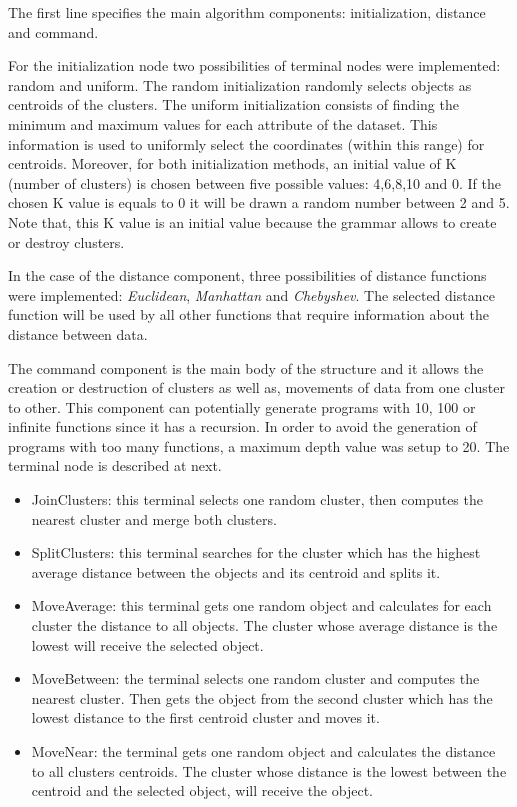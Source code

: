 \documentclass[conference,compsoc]{IEEEtran}
\begin{document}
The first line specifies the main algorithm components: initialization, distance and command. 


For the initialization node two possibilities of terminal nodes were implemented: random and uniform. The random initialization randomly selects  objects as centroids of the clusters. The uniform initialization consists of finding the minimum and maximum values for each attribute of the dataset. This information is used to uniformly select the coordinates (within this range) for centroids. Moreover, for both initialization methods, an initial value of K (number of clusters) is chosen between five possible values: 4,6,8,10 and 0. If the chosen K value is equals to 0 it will be drawn a random number between 2 and 5. Note that, this K value is an initial value because the grammar allows to create or destroy clusters. 


In the case of the distance component, three possibilities of distance functions were implemented: \textit{Euclidean}, \textit{Manhattan} and \textit{Chebyshev}. The selected distance function will be used by all other functions that require information about the distance between data. 


The command component is the main body of the structure and it allows the creation or destruction of clusters as well as, movements of data from one cluster to other. This component can potentially generate programs with 10, 100 or infinite functions since it has a recursion. In order to avoid the generation of programs with too many functions, a maximum depth value was setup to 20. The terminal node is described at next.


\begin{itemize}
	\item JoinClusters: this terminal selects one random cluster, then computes the nearest cluster and merge both clusters.
	\item SplitClusters: this terminal searches for the cluster which has the highest average distance between the objects and its centroid and splits it. 
	\item MoveAverage:  this terminal gets one random object and calculates for each cluster the distance to all objects. The cluster whose average distance is the lowest will receive the selected object.
	\item MoveBetween: the terminal selects one random cluster and computes the nearest cluster. Then gets the object from the second cluster which has the lowest distance to the first centroid cluster and moves it.
	\item MoveNear:  the terminal gets one random object and calculates the distance to all clusters centroids. The cluster whose distance is the lowest between the centroid and the selected object, will receive the object.
\end{itemize}
\end{document}
